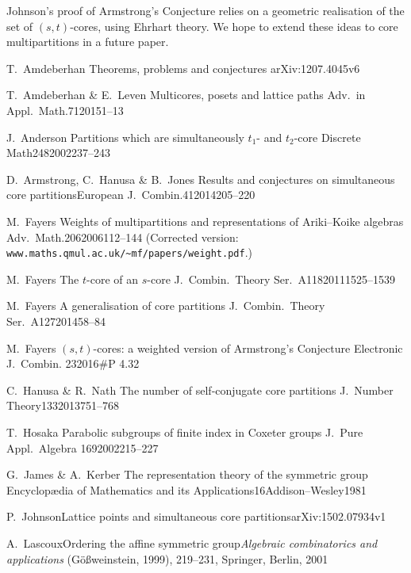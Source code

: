 \documentclass[a4paper, 11pt, twoside]{article}
\begin{document}
Johnson's proof of Armstrong's Conjecture relies on a geometric realisation of the set of $(s,t)$-cores, using Ehrhart theory. We hope to extend these ideas to core multipartitions in a future paper.

\begin{thebibliography}{99}

\backrefparscanfalse

{T.~Amdeberhan}
{Theorems, problems and conjectures}
{arXiv:1207.4045v6}

{T.~Amdeberhan \& E.~Leven}
{Multicores, posets and lattice paths}
{Adv.\ in Appl.\ Math.}{71}{2015}{1--13}

{J.\ Anderson}
{Partitions which are simultaneously $t_1$- and $t_2$-core}
{Discrete Math}{248}{2002}{237--243}

{D.\ Armstrong, C.\ Hanusa \& B.\ Jones}
{Results and conjectures on simultaneous core partitions}{European J.\ Combin.}{41}{2014}{205--220}

{M.\ Fayers}
{Weights of multipartitions and representations of Ariki--Koike algebras}
{Adv.\ Math.}{206}{2006}{112--144}  (Corrected version: \texttt{www.maths.qmul.ac.uk/\~{}mf/papers/weight.pdf}.)

{M.\ Fayers}
{The $t$-core of an $s$-core}
{J.\ Combin.\ Theory Ser.\ A}{118}{2011}{1525--1539}

{M.~Fayers}
{A generalisation of core partitions}
{J.\ Combin.\ Theory Ser.\ A}{127}{2014}{58--84}

{M.~Fayers}
{$(s,t)$-cores: a weighted version of Armstrong's Conjecture}
{Electronic J.~Combin.}
{23}{2016}{\#P 4.32}

{C.~Hanusa \& R.~Nath}
{The number of self-conjugate core partitions}
{J.~Number Theory}{133}{2013}{751--768}

{T.~Hosaka}
{Parabolic subgroups of finite index in Coxeter groups}
{J.~Pure Appl.\ Algebra}
{169}{2002}{215--227}

{G.\ James \& A.\ Kerber}
{The representation theory of the symmetric group}
{Encyclop\ae dia of Mathematics and its Applications}{16}{Addison--Wesley}{1981}

{P.~Johnson}{Lattice points and simultaneous core partitions}{arXiv:1502.07934v1}

{A.\ Lascoux}{Ordering the affine symmetric group}{\textit{Algebraic combinatorics and applications} (G\" o\ss weinstein, 1999), 219--231, Springer, Berlin, 2001}


\end{thebibliography}
\end{document}
